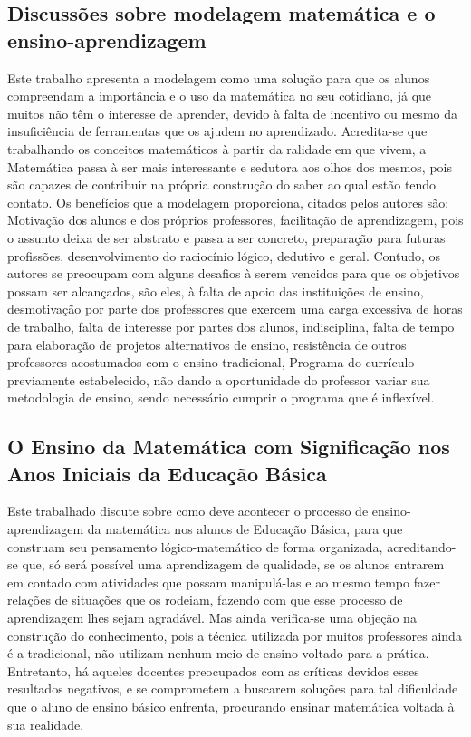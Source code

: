 \documentclass[12pt,a4paper]{article}
\begin{document}
\subsection{Discussões sobre modelagem matemática e o ensino-aprendizagem}
Este trabalho apresenta a modelagem como uma solução para que os alunos compreendam a importância e o uso da matemática no seu cotidiano, já que muitos não têm o interesse de aprender, devido à falta de incentivo ou mesmo da insuficiência de ferramentas que os ajudem no aprendizado. Acredita-se que trabalhando os conceitos matemáticos à partir da ralidade em que vivem, a Matemática passa à ser mais interessante e sedutora aos olhos dos mesmos, pois são capazes de contribuir na própria construção do saber ao qual estão tendo contato. 
Os benefícios que a modelagem proporciona, citados pelos autores são: Motivação dos alunos e dos próprios professores, facilitação de aprendizagem, pois o assunto deixa de ser abstrato e passa a ser concreto, preparação para futuras profissões, desenvolvimento do raciocínio lógico, dedutivo e geral. 
Contudo, os autores se preocupam com alguns desafios à serem vencidos para que os objetivos possam ser alcançados, são eles, à falta de apoio das instituições de ensino, desmotivação por parte dos professores que exercem uma carga excessiva de horas de trabalho, falta de interesse por partes dos alunos, indisciplina, falta de tempo para elaboração de projetos alternativos de ensino, resistência de outros professores acostumados com o ensino tradicional, Programa do currículo previamente estabelecido, não dando a oportunidade do professor variar sua metodologia de ensino, sendo necessário cumprir o programa que é inflexível.\citep{silveira2005discussoes}

\subsection{O Ensino da Matemática com Significação nos Anos Iniciais da Educação Básica}
Este trabalhado discute sobre como deve acontecer o processo de ensino-aprendizagem da matemática nos alunos de Educação Básica, para que construam seu pensamento lógico-matemático de forma organizada, acreditando-se que, só será possível uma aprendizagem de qualidade, se os alunos entrarem em contado com atividades que possam manipulá-las e ao mesmo tempo fazer relações de situações que os rodeiam, fazendo com que esse processo de aprendizagem lhes sejam agradável. 
Mas ainda verifica-se uma objeção na construção do conhecimento, pois a técnica utilizada por muitos professores ainda é a tradicional, não utilizam nenhum meio de ensino voltado para a prática. Entretanto, há aqueles docentes preocupados com as críticas devidos esses resultados negativos, e se comprometem a buscarem soluções para tal dificuldade que o aluno de ensino básico enfrenta, procurando ensinar matemática voltada à sua realidade.\citep{santos2008ensino} 
\end{document}
